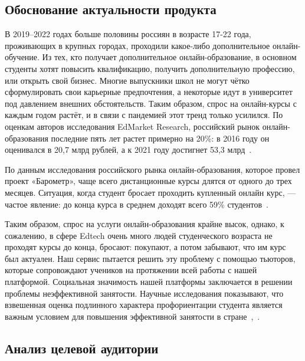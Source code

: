 \documentclass[12pt]{article}
\begin{document}
\subsection{Обоснование актуальности продукта}

В 2019–2022 годах больше половины россиян в возрасте 17-22 года, проживающих в крупных городах, проходили какое-либо дополнительное онлайн-обучение. Из тех, кто получает дополнительное онлайн-образование, в основном студенты хотят повысить квалификацию, получить дополнительную профессию, или открыть свой бизнес. Многие выпускники школ не могут чётко сформулировать свои карьерные предпочтения, а некоторые идут в университет под давлением внешних обстоятельств. Таким образом, спрос на онлайн-курсы с каждым годом растёт, и в связи с пандемией этот тренд только усилился. По оценкам авторов исследования EdMarket Research, российский рынок онлайн-образования последние пять лет растет примерно на 20\%: в 2016 году он оценивался в 20,7 млрд рублей, а к 2021 году достигнет 53,3 млрд~\cite{RussianEdtechStudy2022}. 

По данным исследования российского рынка онлайн-образования, которое провел проект «Барометр», чаще всего дистанционные курсы длятся от одного до трех месяцев. Ситуация, когда студент бросает проходить купленный онлайн курс, — частое явление: до конца курса в среднем доходят всего 59\% студентов~\cite{VentureInvesting}.

Таким образом, спрос на услуги онлайн-образования крайне высок, однако, к сожалению, в сфере Edtech очень много людей студенческого возраста не проходят курсы до конца, бросают: покупают, а потом забывают, что им курс был актуален. Наш сервис пытается решить эту проблему с помощью тьюторов, которые сопровождают учеников на протяжении всей работы с нашей платформой. Социальная значимость нашей платформы заключается в решении проблемы неэффективной занятости. Научные исследования показывают, что взвешенная оценка подлинного характера профориентации студента является важным условием для повышения эффективной занятости в стране~\cite{VentureInvesting},~\cite{Donetsky}.

\subsection{Анализ целевой аудитории}
\end{document}
